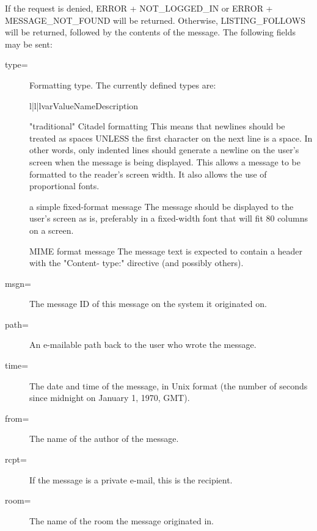  If the request is denied, ERROR + NOT_LOGGED_IN or ERROR + MESSAGE_NOT_FOUND
will be returned.  Otherwise, LISTING_FOLLOWS will be returned, followed by
the contents of the message.  The following fields may be sent:

\begin{description}

\item[type=]
 Formatting type. The currently defined types are:

    \begin{tableiii}{l|l|l}{var}{Value}{Name}{Description}

        {"traditional" Citadel formatting}
        {This means that newlines should be treated as spaces UNLESS the first
        character on the next line is a space.  In other words, only indented
        lines should generate a newline on the user's screen when the message is
        being displayed.  This allows a message to be formatted to the reader's
        screen width. It also allows the use of proportional fonts.}

        {a simple fixed-format message}
        {The message should be displayed to the user's screen as is, preferably
        in a fixed-width font that will fit 80 columns on a screen.}

        {MIME format message}
        {The message text is expected to contain a header with the "Content-
        type:" directive (and possibly others).}

    \end{tableiii}

\item[msgn=]
    The message ID of this message on the system it originated on.

\item[path=]
    An e-mailable path back to the user who wrote the message.

\item[time=]
    The date and time of the message, in Unix format (the number of seconds
    since midnight on January 1, 1970, GMT).

\item[from=]
    The name of the author of the message.

\item[rcpt=]
    If the message is a private e-mail, this is the recipient.

\item[room=]
    The name of the room the message originated in.


\end{description}

